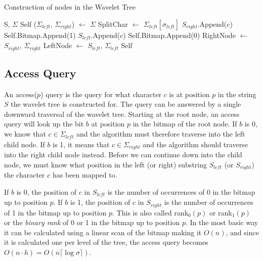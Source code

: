 \begin{algorithm}
\caption{Construction of nodes in the Wavelet Tree}
\label{alg:ConstructNode}
\begin{algorithmic}
 {S, $\Sigma$}
	\State \Return Self
\EndIf
\State ($\Sigma_{\mathit{left}}$, $\Sigma_{\mathit{right}}$) $\gets$ $\Sigma$
\State SplitChar $\gets$ $\Sigma_{\mathit{left}}[\sigma_{\mathit{left}}]$
		\State $S_{\mathit{right}}$.Append($c$)
		\State Self.Bitmap.Append(1)
	\Else
		\State $S_{\mathit{left}}$.Append($c$)
		\State Self.Bitmap.Append(0)
	\EndIf
\EndFor
\State RightNode $\gets$  {$S_{\mathit{right}}$, $\Sigma_{\mathit{right}}$}
\State LeftNode $\gets$  {$S_{\mathit{left}}$, $\Sigma_{\mathit{left}}$}
\State \Return Self
\EndFunction
\end{algorithmic}
\end{algorithm}


\subsection{Access Query}
An access($p$) query is the query for what character $c$ is at position $p$ in the string $S$ the wavelet tree is constructed for.
The query can be answered by a single downward traversal of the wavelet tree.
Starting at the root node, an access query will look up the bit $b$ at position $p$ in the bitmap of the root node.
If $b$ is 0, we know that $c \in \Sigma_{\mathit{left}}$ and the algorithm must therefore traverse into the left child node.
If $b$ is 1, it means that $c \in \Sigma_{\mathit{right}}$ and the algorithm should traverse into the right child node instead.
Before we can continue down into the child node, we must know what position in the left (or right) substring $S_{\mathit{left}}$ (or $S_{\mathit{right}}$) the character $c$ has been mapped to.

If $b$ is 0, the position of $c$ in $S_{\mathit{left}}$ is the number of occurrences of 0 in the bitmap up to position $p$.
If $b$ is 1, the position of $c$ in $S_{\mathit{right}}$ is the number of occurrences of 1 in the bitmap up to position $p$.
This is also called rank$_0(p)$ or rank$_1(p)$ or the \textit{binary rank} of 0 or 1 in the bitmap up to position $p$.
In the most basic way it can be calculated using a linear scan of the bitmap making it $O(n)$, and since it is calculated one per level of the tree, the access query becomes $O(n \cdot h) = O(n \lceil \log \sigma \rceil)$.

